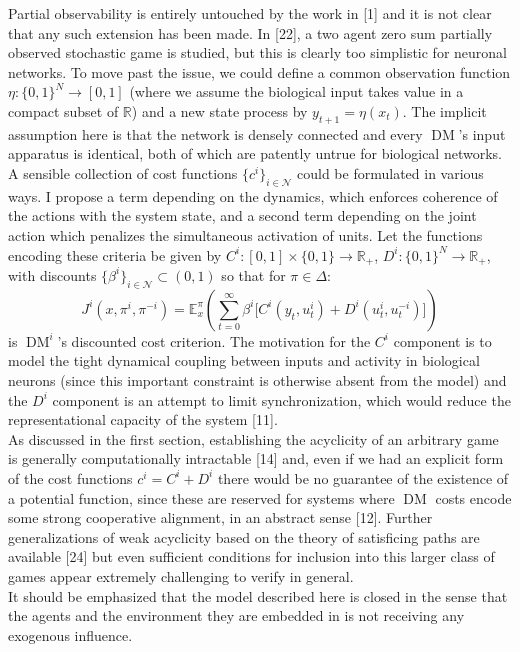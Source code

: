\documentclass[10pt]{article}
\newcommand{\E}{\mathbb{E}}
\newcommand{\bp}[1]{\left({#1}\right)}
\newcommand{\mbb}[1]{\mathbb{#1}}
\newcommand{\1}[1]{\mathbbm{1}_{#1}}
\newcommand{\mc}[1]{\mathcal{#1}}
\DeclareMathOperator{\DM}{DM}
\begin{document}
Partial observability is entirely untouched by the work in [1] and it is not clear that any such extension has been made. In [22], a two agent zero sum partially observed stochastic game is studied, but this is clearly too simplistic for neuronal networks. To move past the issue, we could define a common observation function $\eta:\{0,1\}^N\rightarrow[0,1]$ (where we assume the biological input takes value in a compact subset of $\mbb{R}$) and a new state process by
$y_{t+1}=\eta(x_{t})$. The implicit assumption here is that the network is densely connected and every $\DM$'s input apparatus is identical, both of which are patently untrue for biological networks.\\[5pt]
A sensible collection of cost functions $\{c^i\}_{i\in\mc{N}}$ could be formulated in various ways. I propose a term depending on the dynamics, which enforces coherence of the actions with the system state, and a second term depending on the joint action which penalizes the simultaneous activation of units.
Let the functions encoding these criteria be given by $C^i:[0,1]\times\{0,1\}\rightarrow\mbb{R}_+$, $D^i:\{0,1\}^N\rightarrow\mbb{R}_+$, with discounts $\{\beta^i\}_{i\in\mc{N}}\subset(0,1)$ so that for $\pi\in\Delta$:
\[J^i(x,\pi^i,\pi^{-i})=\E^\pi_x\bp{\sum_{t=0}^\infty\beta^i\big[C^i(y_t,u^i_t)+D^i(u_t^i,u_t^{-i})\big]}\]
is $\DM^i$'s discounted cost criterion. The motivation for the $C^i$ component is to model the tight dynamical coupling between inputs and activity in biological neurons (since this important constraint is otherwise absent from the model) and the $D^i$ component is an attempt to limit synchronization, which would reduce the representational capacity of the system [11].\\[5pt]
As discussed in the first section, establishing the acyclicity of an arbitrary game is generally computationally intractable [14] and, even if we had an explicit form of the cost functions $c^i=C^i+D^i$ there would be no guarantee of the existence of a potential function, since these are reserved for systems where $\DM$ costs encode some strong cooperative alignment,
in an abstract sense [12]. Further generalizations of weak acyclicity based on the theory of satisficing paths are available [24] but even sufficient conditions for inclusion into this larger class of games appear extremely challenging to verify in general.\\[5pt]
It should be emphasized that the model described here is closed in the sense that the agents and the environment they are embedded in is not receiving any exogenous influence.
\end{document}
